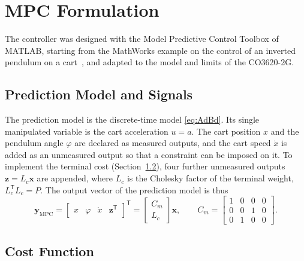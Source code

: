 \section{MPC Formulation}
\label{sec:mpc}

The controller was designed with the Model Predictive Control Toolbox of
MATLAB, starting from the MathWorks example on the control of an inverted
pendulum on a cart~\cite{mathworks_pendcart}, and adapted to the model and
limits of the CO3620-2G.

\subsection{Prediction Model and Signals}
\label{subsec:predmodel}

The prediction model is the discrete-time model \eqref{eq:AdBd}. Its single
manipulated variable is the cart acceleration $u = a$. The cart position $x$
and the pendulum angle $\varphi$ are declared as measured outputs, and the cart
speed $\dot{x}$ is added as an unmeasured output so that a constraint can be
imposed on it. To implement the terminal cost (Section~\ref{subsec:cost}),
four further unmeasured outputs $\mathbf{z} = L_c\mathbf{x}$ are appended,
where $L_c$ is the Cholesky factor of the terminal weight,
$L_c^{\mathsf{T}}L_c = P$. The output vector of the prediction model is thus
\begin{equation}
  \mathbf{y}_{\mathrm{MPC}} =
  \begin{bmatrix} x & \varphi & \dot{x} & \mathbf{z}^{\mathsf{T}} \end{bmatrix}^{\mathsf{T}}
  = \begin{bmatrix} C_m \\ L_c \end{bmatrix}\mathbf{x}, \qquad
  C_m = \begin{bmatrix} 1&0&0&0\\ 0&0&1&0\\ 0&1&0&0 \end{bmatrix}.
  \label{eq:mpcoutputs}
\end{equation}

\subsection{Cost Function}
\label{subsec:cost}

